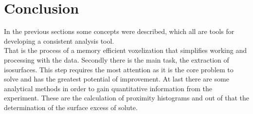 \chapter{Conclusion}
\label{conlclusion}

In the previous sections some concepts were described, which all are tools for developing a consistent analysis tool.\\
That is the process of a memory efficient voxelization that simplifies working and processing with the data.
Secondly there is the main task, the extraction of isosurfaces. This step requires the most attention as it is the core problem to solve and has the greatest potential of improvement.
At last there are some analytical methods in order to gain quantitative information from the experiment. These are the calculation of proximity histograms and out of that the determination of the surface excess of solute.